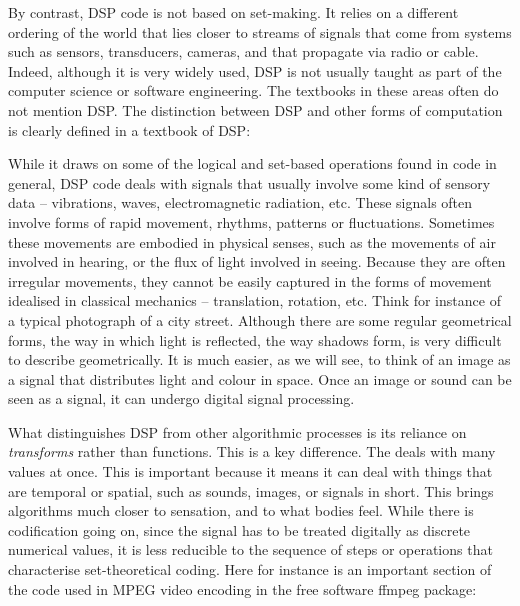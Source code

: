 By contrast, DSP code is not based on set{}-making. It relies on a
different ordering of the world that lies closer to streams of signals
that come from systems such as sensors, transducers, cameras, and that
propagate via radio or cable. Indeed, although it is very widely used,
DSP is not usually taught as part of the computer science or software
engineering. The textbooks in these areas often do not mention DSP. The
distinction between DSP and other forms of computation is clearly
defined in a textbook of DSP:


While it draws on some of the logical and set{}-based operations found
in code in general, DSP code deals with signals that usually involve
some kind of sensory data {--} vibrations, waves, electromagnetic
radiation, etc. These signals often involve forms of rapid movement,
rhythms, patterns or fluctuations. Sometimes these movements are
embodied in physical senses, such as the movements of air involved in
hearing, or the flux of light involved in seeing. Because they are
often irregular movements, they cannot be easily captured in the forms
of movement idealised in classical mechanics {--} translation,
rotation, etc. Think for instance of a typical photograph of a city
street. Although there are some regular geometrical forms, the way in
which light is reflected, the way shadows form, is very difficult to
describe geometrically. It is much easier, as we will see, to think of
an image as a signal that distributes light and colour in space. Once
an image or sound can be seen as a signal, it can undergo digital
signal processing. 

What distinguishes DSP from other algorithmic processes is its reliance
on {\em transforms} rather than functions. This is a key difference.
The  deals with many values at once. This is important
because it means it can deal with things that are temporal or spatial,
such as sounds, images, or signals in short. This brings algorithms
much closer to sensation, and to what bodies feel. While there is
codification going on, since the signal has to be treated digitally as
discrete numerical values, it is less reducible to the sequence of
steps or operations that characterise set{}-theoretical coding. Here
for instance is an important section of the code used in MPEG video
encoding in the free software ffmpeg package:


